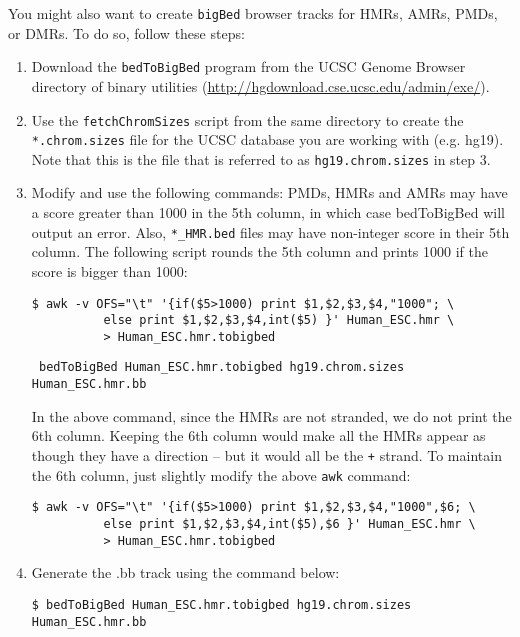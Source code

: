 \documentclass[10pt]{article}
\newcommand{\prog}[1]{\texttt{#1}}
\newcommand{\fn}[1]{\texttt{#1}}
\newcommand{\lit}[1]{\texttt{#1}}
\begin{document}
{{\noindent
You might also want to create \fn{bigBed} browser tracks for HMRs,
AMRs, PMDs, or DMRs. To do so, follow these steps:
\begin{enumerate}
\item Download the \prog{bedToBigBed} program from the UCSC Genome
  Browser directory of binary utilities
  (\url{http://hgdownload.cse.ucsc.edu/admin/exe/}).
\item Use the \fn{fetchChromSizes} script from the same directory to
  create the \fn{*.chrom.sizes} file for the UCSC database you are
  working with (e.g. hg19). Note that this is the file that is
  referred to as \fn{hg19.chrom.sizes} in step 3.
\item Modify and use the following commands: PMDs, HMRs and AMRs may
  have a score greater than 1000 in the 5th column, in which case
  bedToBigBed will output an error. Also, \fn{*\_HMR.bed} files
  may have non-integer score in their 5th column. The following script 
  rounds the 5th column and prints 1000 if the score is bigger than 1000:
\begin{verbatim}
$ awk -v OFS="\t" '{if($5>1000) print $1,$2,$3,$4,"1000"; \
          else print $1,$2,$3,$4,int($5) }' Human_ESC.hmr \
          > Human_ESC.hmr.tobigbed
\end{verbatim}

\begin{verbatim}
 bedToBigBed Human_ESC.hmr.tobigbed hg19.chrom.sizes Human_ESC.hmr.bb
\end{verbatim}

  In the above command, since the HMRs are not stranded, we do not
  print the 6th column. Keeping the 6th column would make all the HMRs
  appear as though they have a direction -- but it would all be the
  \lit{+} strand. To maintain the 6th column, just slightly modify the 
  above \prog{awk} command:

\begin{verbatim}
$ awk -v OFS="\t" '{if($5>1000) print $1,$2,$3,$4,"1000",$6; \
          else print $1,$2,$3,$4,int($5),$6 }' Human_ESC.hmr \
          > Human_ESC.hmr.tobigbed
\end{verbatim}

\item Generate the .bb track using the command below:

\begin{verbatim}
$ bedToBigBed Human_ESC.hmr.tobigbed hg19.chrom.sizes Human_ESC.hmr.bb
\end{verbatim}  
\end{enumerate}

}}
\end{document}
